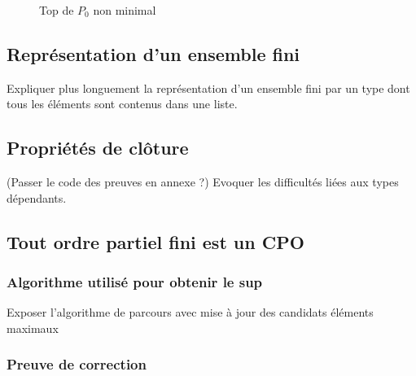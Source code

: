 \documentclass{article}
\theoremstyle{definition}
\begin{document}
\usetikzlibrary {arrows.meta,automata,positioning} 
\begin{figure}[ht]
\centering
\resizebox{0.15\linewidth}{!}
	{
	}
\caption{Top de $P_0$ non minimal}
\end{figure}

\subsection{Représentation d'un ensemble fini}

Expliquer plus longuement la représentation d'un ensemble fini par un type dont tous les éléments sont contenus dans une liste.


\subsection{Propriétés de clôture}

(Passer le code des preuves en annexe ?)
Evoquer les difficultés liées aux types dépendants.


\subsection{Tout ordre partiel fini est un CPO}

\subsubsection{Algorithme utilisé pour obtenir le sup}

Exposer l'algorithme de parcours avec mise à jour des candidats éléments maximaux

\subsubsection{Preuve de correction}
\end{document}
